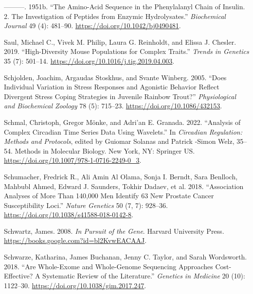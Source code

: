 \documentclass[
]{book}
\newlength{\cslhangindent}
\newlength{\cslentryspacingunit} %
\newenvironment{CSLReferences}[2] %
 {%
  \setlength{\parindent}{0pt}
  \ifodd #1
  \let\oldpar\par
  \def\par{\hangindent=\cslhangindent\oldpar}
  \fi
  \setlength{\parskip}{#2\cslentryspacingunit}
 }%
 {}
\begin{document}
\begin{CSLReferences}{1}{0}
\leavevmode{}%
---------. 1951b. {``The Amino-Acid Sequence in the Phenylalanyl Chain of Insulin. 2. {The} Investigation of Peptides from Enzymic Hydrolysates.''} \emph{Biochemical Journal} 49 (4): 481--90. \url{https://doi.org/10.1042/bj0490481}.

\leavevmode{}%
Saul, Michael C., Vivek M. Philip, Laura G. Reinholdt, and Elissa J. Chesler. 2019. {``High-{Diversity Mouse Populations} for {Complex Traits}.''} \emph{Trends in Genetics} 35 (7): 501--14. \url{https://doi.org/10.1016/j.tig.2019.04.003}.

\leavevmode{}%
Schjolden, Joachim, Argaudas Stoskhus, and Svante Winberg. 2005. {``Does {Individual Variation} in {Stress Responses} and {Agonistic Behavior Reflect Divergent Stress Coping Strategies} in {Juvenile Rainbow Trout}?''} \emph{Physiological and Biochemical Zoology} 78 (5): 715--23. \url{https://doi.org/10.1086/432153}.

\leavevmode{}%
Schmal, Christoph, Gregor Mönke, and Adri'an E. Granada. 2022. {``Analysis of {Complex Circadian Time Series Data Using Wavelets}.''} In \emph{Circadian {Regulation}: {Methods} and {Protocols}}, edited by Guiomar Solanas and Patrick -Simon Welz, 35--54. Methods in {Molecular Biology}. {New York, NY}: {Springer US}. \url{https://doi.org/10.1007/978-1-0716-2249-0_3}.

\leavevmode{}%
Schumacher, Fredrick R., Ali Amin Al Olama, Sonja I. Berndt, Sara Benlloch, Mahbubl Ahmed, Edward J. Saunders, Tokhir Dadaev, et al. 2018. {``Association Analyses of More Than 140,000 Men Identify 63 New Prostate Cancer Susceptibility Loci.''} \emph{Nature Genetics} 50 (7, 7): 928--36. \url{https://doi.org/10.1038/s41588-018-0142-8}.

\leavevmode{}%
Schwartz, James. 2008. \emph{In {Pursuit} of the {Gene}}. {Harvard University Press}. \url{https://books.google.com?id=bl2KvwEACAAJ}.

\leavevmode{}%
Schwarze, Katharina, James Buchanan, Jenny C. Taylor, and Sarah Wordsworth. 2018. {``Are Whole-Exome and Whole-Genome Sequencing Approaches Cost-Effective? {A} Systematic Review of the Literature.''} \emph{Genetics in Medicine} 20 (10): 1122--30. \url{https://doi.org/10.1038/gim.2017.247}.


\end{CSLReferences}
\end{document}
